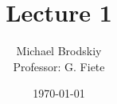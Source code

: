 


\title{Lecture 1}
\date{\today}
\author{Michael Brodskiy\\ \small Professor: G. Fiete}



\maketitle

